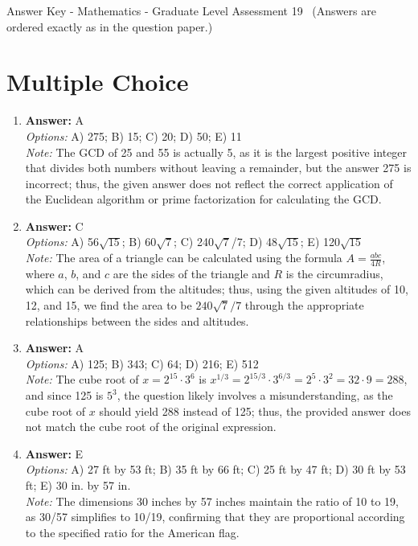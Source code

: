 \documentclass[12pt]{article}
\begin{document}
\begin{center}
Answer Key - Mathematics - Graduate Level Assessment 19 \
\small (Answers are ordered exactly as in the question paper.)
\end{center}

\section*{Multiple Choice}
\begin{enumerate}[label=\arabic*.]
\item \textbf{Answer:} A
\\ \textit{Options:} A) 275; B) 15; C) 20; D) 50; E) 11
\\ \textit{Note:} The GCD of 25 and 55 is actually 5, as it is the largest positive integer that divides both numbers without leaving a remainder, but the answer 275 is incorrect; thus, the given answer does not reflect the correct application of the Euclidean algorithm or prime factorization for calculating the GCD.
\item \textbf{Answer:} C
\\ \textit{Options:} A) 56\ensuremath{\sqrt{15}}; B) 60\ensuremath{\sqrt{7}}; C) 240\ensuremath{\sqrt{7}}/7; D) 48\ensuremath{\sqrt{15}}; E) 120\ensuremath{\sqrt{15}}
\\ \textit{Note:} The area of a triangle can be calculated using the formula \(A = \frac{abc}{4 R}\), where \(a\), \(b\), and \(c\) are the sides of the triangle and \(R\) is the circumradius, which can be derived from the altitudes; thus, using the given altitudes of 10, 12, and 15, we find the area to be \(240\sqrt{7}/7\) through the appropriate relationships between the sides and altitudes.
\item \textbf{Answer:} A
\\ \textit{Options:} A) 125; B) 343; C) 64; D) 216; E) 512
\\ \textit{Note:} The cube root of $x = 2^{15} \cdot 3^6$ is $x^{1/3} = 2^{15/3} \cdot 3^{6/3} = 2^5 \cdot 3^2 = 32 \cdot 9 = 288$, and since 125 is $5^3$, the question likely involves a misunderstanding, as the cube root of $x$ should yield 288 instead of 125; thus, the provided answer does not match the cube root of the original expression.
\item \textbf{Answer:} E
\\ \textit{Options:} A) 27 ft by 53 ft; B) 35 ft by 66 ft; C) 25 ft by 47 ft; D) 30 ft by 53 ft; E) 30 in. by 57 in.
\\ \textit{Note:} The dimensions 30 inches by 57 inches maintain the ratio of 10 to 19, as 30/57 simplifies to 10/19, confirming that they are proportional according to the specified ratio for the American flag.

\end{enumerate}
\end{document}
